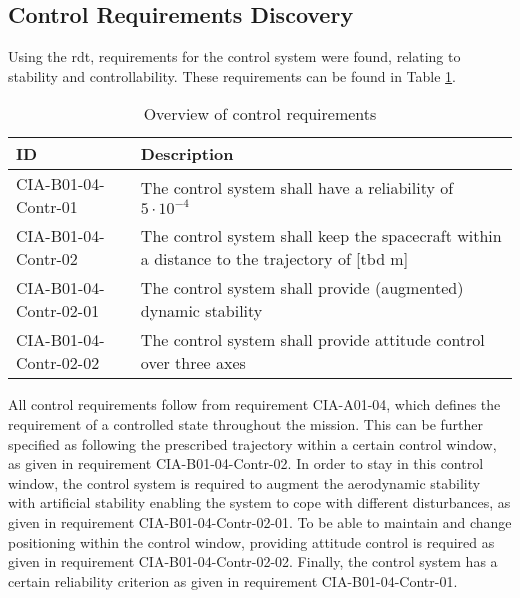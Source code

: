 \subsection{Control Requirements Discovery} \label{sec:req-control}
Using the \gls{rdt}, requirements for the control system were found, relating to stability and controllability. These requirements can be found in Table \ref{tab:controlreq}.

\begin{table}[H]
	\caption{Overview of control requirements}
	\begin{tabular}{|p{}|p{}|}
		\hline
		ID         					&	Description																							\\ \hline \hline
		CIA-B01-04-Contr-01		&	The control system shall have a reliability of $5 \cdot 10^{-4}$            									\\ \hline
		CIA-B01-04-Contr-02 		&	The control system shall keep the spacecraft within a distance to the trajectory of [\gls{tbd} m]	\\ \hline	
		CIA-B01-04-Contr-02-01 	&	The control system shall provide (augmented) dynamic stability       								\\ \hline
		CIA-B01-04-Contr-02-02 	&	The control system shall provide attitude control over three axes         							\\ \hline	
	\end{tabular}
	\label{tab:controlreq}
\end{table}

All control requirements follow from requirement CIA-A01-04, which defines the requirement of a controlled state throughout the mission. 
This can be further specified as following the prescribed trajectory within a certain control window, as given in requirement CIA-B01-04-Contr-02. 
In order to stay in this control window, the control system is required to augment the aerodynamic stability with artificial stability enabling the system to cope with different disturbances, as given in requirement CIA-B01-04-Contr-02-01. 
To be able to maintain and change positioning within the control window, providing attitude control is required as given in requirement CIA-B01-04-Contr-02-02. 
Finally, the control system has a certain reliability criterion as given in requirement CIA-B01-04-Contr-01.